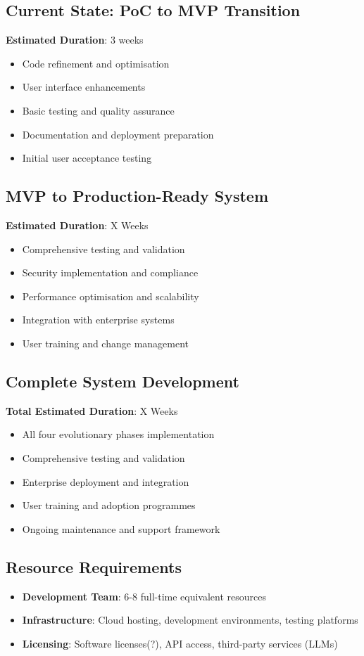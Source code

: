 \documentclass{article}
\begin{document}
\subsection{Current State: PoC to MVP Transition}
\textbf{Estimated Duration}: 3 weeks
\begin{itemize}
    \item Code refinement and optimisation
    \item User interface enhancements
    \item Basic testing and quality assurance
    \item Documentation and deployment preparation
    \item Initial user acceptance testing
\end{itemize}

\subsection{MVP to Production-Ready System}
\textbf{Estimated Duration}: X Weeks
\begin{itemize}
    \item Comprehensive testing and validation
    \item Security implementation and compliance
    \item Performance optimisation and scalability
    \item Integration with enterprise systems
    \item User training and change management
\end{itemize}

\subsection{Complete System Development}
\textbf{Total Estimated Duration}: X Weeks
\begin{itemize}
    \item All four evolutionary phases implementation
    \item Comprehensive testing and validation
    \item Enterprise deployment and integration
    \item User training and adoption programmes
    \item Ongoing maintenance and support framework
\end{itemize}

\subsection{Resource Requirements}
\begin{itemize}
    \item \textbf{Development Team}: 6-8 full-time equivalent resources
    \item \textbf{Infrastructure}: Cloud hosting, development environments, testing platforms
    \item \textbf{Licensing}: Software licenses(?), API access, third-party services (LLMs)
\end{itemize}
\end{document}
